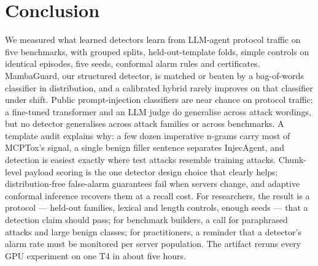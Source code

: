 \documentclass[conference,compsoc]{IEEEtran}
\begin{document}
\section{Conclusion}
\label{sec:conclusion}
We measured what learned detectors learn from LLM-agent protocol traffic on five benchmarks, with grouped splits, held-out-template folds, simple controls on identical episodes, five seeds, conformal alarm rules and certificates. MambaGuard, our structured detector, is matched or beaten by a bag-of-words classifier in distribution, and a calibrated hybrid rarely improves on that classifier under shift. Public prompt-injection classifiers are near chance on protocol traffic; a fine-tuned transformer and an LLM judge do generalise across attack wordings, but no detector generalises across attack families or across benchmarks. A template audit explains why: a few dozen imperative n-grams carry most of MCPTox's signal, a single benign filler sentence separates InjecAgent, and detection is easiest exactly where test attacks resemble training attacks. Chunk-level payload scoring is the one detector design choice that clearly helps; distribution-free false-alarm guarantees fail when servers change, and adaptive conformal inference recovers them at a recall cost. For researchers, the result is a protocol --- held-out families, lexical and length controls, enough seeds --- that a detection claim should pass; for benchmark builders, a call for paraphrased attacks and large benign classes; for practitioners, a reminder that a detector's alarm rate must be monitored per server population. The artifact reruns every GPU experiment on one T4 in about five hours.
\end{document}

